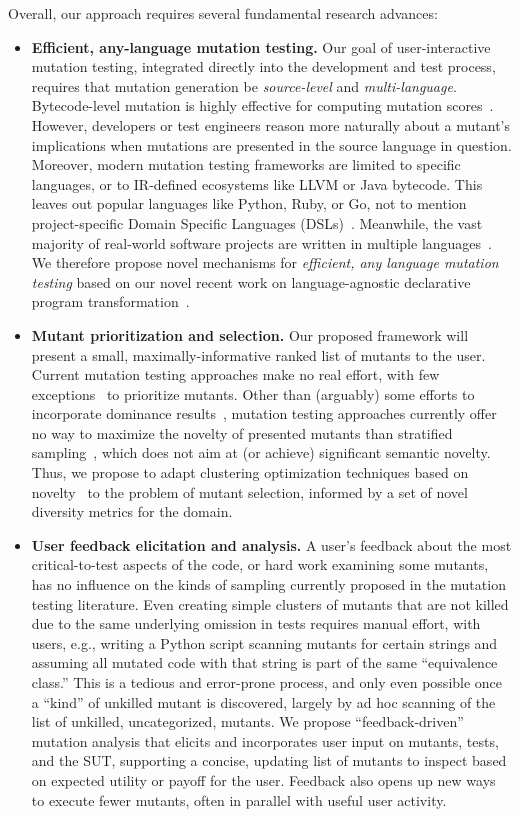 Overall, our approach requires several fundamental research advances:
\begin{itemize}[labelsep=3pt,leftmargin=12pt]
\item \textbf{Efficient, any-language mutation testing.}
Our goal of user-interactive mutation testing, integrated directly into
the development and test process, requires that mutation generation be
\emph{source-level} and \emph{multi-language}.
Bytecode-level mutation is highly effective for computing
mutation scores~\cite{pittest,HaririLLVM}.  However, developers or test
engineers reason more naturally about a mutant's implications when mutations
are presented in the source language in question.  Moreover, modern mutation
testing frameworks are limited to specific languages, or to IR-defined
ecosystems like LLVM or Java bytecode.  This leaves out popular languages like Python, Ruby, or Go, not
to mention project-specific Domain Specific Languages (DSLs)~\cite{Fow10}.
Meanwhile, the vast majority of
real-world software projects are written in multiple languages~\cite{Ray2014}.
We therefore propose novel mechanisms for \emph{efficient, any language mutation
  testing} based on our novel recent work on language-agnostic declarative
program transformation~\cite{rvt-ppc}.
\item \textbf{Mutant prioritization and selection.}  Our
  proposed framework will present a small, maximally-informative ranked list of
  mutants to the user.
Current mutation testing approaches make
no real effort, with few exceptions~\cite{MutGoogle,FaRM} to prioritize mutants.
Other than (arguably) some efforts to
incorporate dominance results~\cite{MutQuality}, mutation testing approaches
currently offer no way to maximize the novelty of presented
mutants than stratified sampling~\cite{gopinath2017mutation}, which
does not aim at (or achieve) significant semantic novelty.  Thus,
we propose to adapt clustering optimization techniques based on 
novelty~\cite{Gonzalez85} to the problem of mutant selection, informed by a set
of novel diversity metrics for the domain.
\item \textbf{User feedback elicitation and analysis.}
A
user's feedback about the most critical-to-test aspects of the code, or hard
work examining some mutants, has no influence on the kinds of sampling currently
proposed in the mutation testing literature.
Even creating simple clusters of
mutants that are not killed due to the same underlying omission in tests
requires manual effort, with users, e.g., writing a Python script scanning
mutants for certain strings and assuming all mutated code with that string is
part of the same ``equivalence class.''  This is a tedious and error-prone
process, and only even possible once a ``kind'' of unkilled mutant is
discovered, largely by ad hoc scanning of the list of unkilled, uncategorized,
mutants.
We propose ``feedback-driven'' mutation analysis that elicits and incorporates
user input on mutants, tests, and the SUT, supporting a concise, updating list
of mutants to inspect based on expected utility or payoff for the
user.  Feedback also opens up new ways to execute fewer mutants, 
often in parallel with useful user activity.
\end{itemize}

